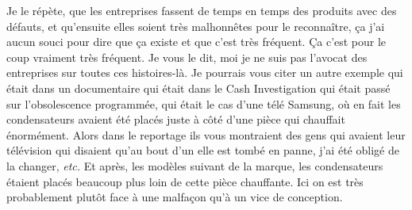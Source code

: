 \begin{small}
Je le répète, que les entreprises fassent de temps en temps des produits avec des défauts, et qu'ensuite elles soient très malhonnêtes pour le reconnaître, ça j'ai aucun souci pour dire que ça existe et que c'est très fréquent. Ça c'est pour le coup vraiment très fréquent. Je vous le dit, moi je ne suis pas l'avocat des entreprises sur toutes ces histoires-là.
Je pourrais vous citer un autre exemple qui était dans un documentaire qui était dans le Cash Investigation qui était passé sur l'obsolescence programmée, qui était le cas d'une télé Samsung, où en fait les condensateurs avaient été placés juste à côté d'une pièce qui chauffait énormément. Alors dans le reportage ils vous montraient des gens qui avaient leur télévision qui disaient qu'au bout d'un elle est tombé en panne, j'ai été obligé de la changer, \textit{etc.} Et après, les modèles suivant de la marque, les condensateurs étaient placés beaucoup plus loin de cette pièce chauffante. Ici on est très probablement plutôt face à une malfaçon qu'à un vice de conception. 

\end{small}
